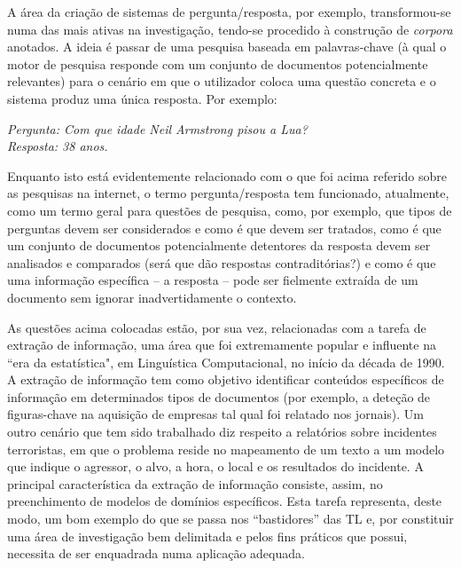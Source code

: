 \begin{multicols}{2}

A área da criação de sistemas de pergunta/resposta, por exemplo, transformou-se numa das mais ativas na investigação, tendo-se procedido à construção de \textit{corpora} anotados. A ideia é passar de uma pesquisa baseada em palavras-chave (à qual o motor de pesquisa responde com um conjunto de do\-cu\-men\-tos potencialmente relevantes) para o cenário em que o utilizador coloca uma questão concreta e o sistema produz uma única resposta. Por exemplo: 

\textit{Pergunta: Com que idade Neil Armstrong pisou a Lua?}\\
\textit{Resposta: 38 anos.}

Enquanto isto está evidentemente relacionado com o que foi acima referido sobre as pesquisas na internet, o termo pergunta/resposta tem funcionado, atualmente, como um termo geral para questões de pesquisa, como, por exemplo, que tipos de perguntas devem ser considerados e como é que devem ser tratados, como é que um conjunto de documentos potencialmente detentores da resposta devem ser analisados e comparados (será que dão respostas contraditórias?) e como é que uma informação específica – a resposta – pode ser fielmente extraída de um documento sem ignorar inadvertidamente o contexto.

As questões acima colocadas estão, por sua vez, relacionadas com a tarefa de extração de informação, uma área que foi extremamente popular e influente na “era da estatística", em Linguística Computacional, no início da década de 1990. A extração de informação tem como objetivo identificar conteúdos específicos de informação em determinados tipos de documentos (por exemplo, a deteção de figuras-chave na aquisição de empresas tal qual foi relatado nos jornais). Um outro cenário que tem sido trabalhado diz respeito a relatórios sobre incidentes terroristas, em que o problema reside no mapeamento de um texto a um modelo que indique o agressor, o alvo, a hora, o local e os resultados do incidente. A principal característica da extração de informação consiste, assim, no preenchimento de modelos de domínios específicos. Esta tarefa representa, deste modo, um bom exemplo do que se passa nos “bastidores” das TL e, por constituir uma área de investigação bem delimitada e pelos fins práticos que possui, necessita de ser enquadrada numa aplicação adequada.


\end{multicols}
